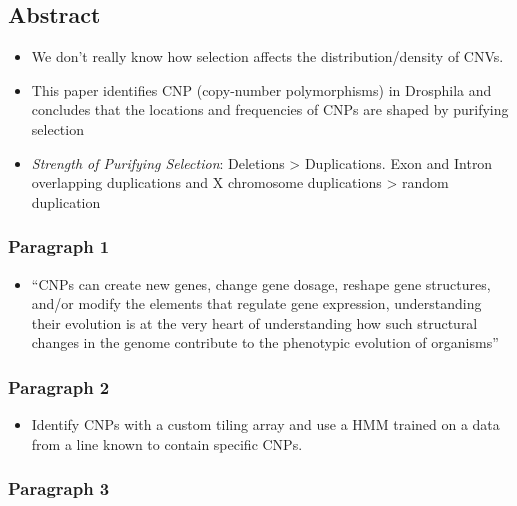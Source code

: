 \documentclass[]{book}
\providecommand{\tightlist}{%
  \setlength{\itemsep}{0pt}\setlength{\parskip}{0pt}}
\begin{document}
\hypertarget{abstract-1}{%
\subsection{Abstract}\label{abstract-1}}

\begin{itemize}
\tightlist
\item
  We don't really know how selection affects the distribution/density of CNVs.
\item
  This paper identifies CNP (copy-number polymorphisms) in Drosphila and concludes that the locations and frequencies of CNPs are shaped by purifying selection
\item
  \emph{Strength of Purifying Selection}: Deletions \textgreater{} Duplications. Exon and Intron overlapping duplications and X chromosome duplications \textgreater{} random duplication
\end{itemize}

\hypertarget{paragraph-1}{%
\subsubsection{Paragraph 1}\label{paragraph-1}}

\begin{itemize}
\tightlist
\item
  ``CNPs can create new genes, change gene dosage, reshape gene structures, and/or modify the elements that regulate gene expression, understanding their evolution is at the very heart of understanding how such structural changes in the genome contribute to the phenotypic evolution of organisms''
\end{itemize}

\hypertarget{paragraph-2}{%
\subsubsection{Paragraph 2}\label{paragraph-2}}

\begin{itemize}
\tightlist
\item
  Identify CNPs with a custom tiling array and use a HMM trained on a data from a line known to contain specific CNPs.
\end{itemize}

\hypertarget{paragraph-3}{%
\subsubsection{Paragraph 3}\label{paragraph-3}}
\end{document}
